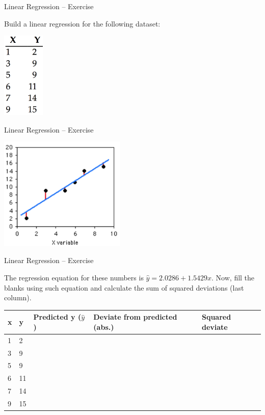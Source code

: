 \documentclass{beamer}
\begin{document}
\begin{frame}
{\centerline{Linear Regression -- Exercise}}

Build a linear regression for the following dataset:
\begin{center}
\includegraphics[width=2cm]{P2023.AIBCCSS.FoundationsDataScience/points-1.png}
\end{center}

\end{frame}
\begin{frame}
{\centerline{Linear Regression -- Exercise}}

\begin{center}
\includegraphics[width=6cm]{P2023.AIBCCSS.FoundationsDataScience/points-2.png}   
\end{center}


\end{frame}




\begin{frame}
{\centerline{Linear Regression -- Exercise}}

The regression equation for these numbers is $\hat{y}=2.0286+1.5429x$. Now, fill the blanks using such equation and calculate the sum of squared deviations (last column).
\small
\begin{table}[]
\centering
\begin{tabular}{l | l | l | l| l} 
\toprule
x & y & Predicted y ($\hat{y}$) & Deviate from predicted (abs.) & Squared deviate \\
\midrule
1 & 2 &  &  &  \\
3 & 9 &  &  &  \\
5 & 9 &  &  &  \\
6 & 11 &  &  &  \\
7 & 14 & &  &  \\
9 & 15 &  &  &  \\

\bottomrule

\end{tabular}
\end{table}
\end{frame}
\end{document}
